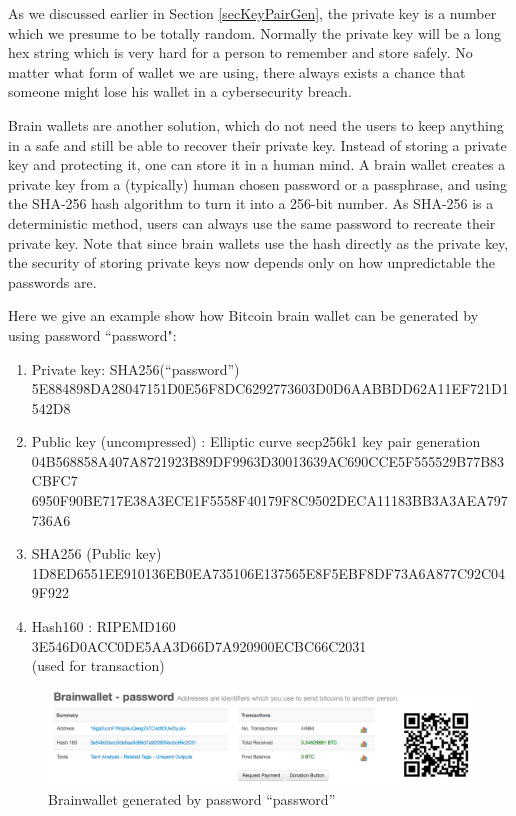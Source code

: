 As we discussed earlier in Section \ref{secKeyPairGen}, the private key is a number which we presume to be totally random. Normally the private key will be a long hex string which is very hard for a person to remember and store safely. No matter what form of wallet we are using, there always exists a chance that someone might lose his wallet in a cybersecurity breach.  

Brain wallets are another solution, which do not need the users to keep anything in a safe and still be able to recover their private key. Instead of storing a private key and protecting it, one can store it in a human mind. A brain wallet creates a private key from a (typically) human chosen password or a passphrase, and using the SHA-256 hash algorithm to turn it into a 256-bit number. As SHA-256 is a deterministic method, users can always use the same password to recreate their private key. Note that since brain wallets use the hash directly as the private key, the security of storing private keys now depends only on how unpredictable the passwords are. 

Here we give an example show how Bitcoin brain wallet can be generated by using password ``password":
\begin{footnotesize}
	\begin{enumerate}
		\item Private key: SHA256(``password'') \\
		5E884898DA28047151D0E56F8DC6292773603D0D6AABBDD62A11EF721D1542D8
		\item Public key (uncompressed) : Elliptic curve secp256k1 key pair generation \\ 04B568858A407A8721923B89DF9963D30013639AC690CCE5F555529B77B83CBFC7\\6950F90BE717E38A3ECE1F5558F40179F8C9502DECA11183BB3A3AEA797736A6
		\item SHA256 (Public key) \\
		1D8ED6551EE910136EB0EA735106E137565E8F5EBF8DF73A6A877C92C049F922
		\item Hash160 : RIPEMD160 \\
		3E546D0ACC0DE5AA3D66D7A920900ECBC66C2031\\
		(used for transaction)
	\end{enumerate}
\end{footnotesize}

\begin{figure}[h!]
	\centering
	\includegraphics[width=140mm]{./pics/brainwallet-password.png}
	\caption{Brainwallet generated by password ``password''}
	\label{fig:brainwallet_password}
\end{figure}

